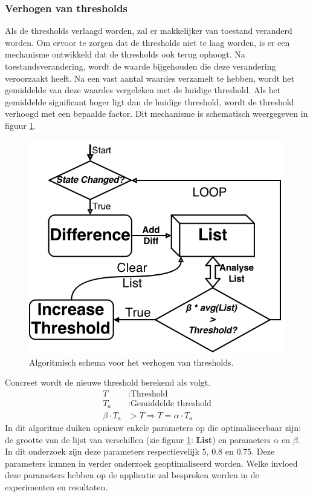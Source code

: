 \documentclass{article}
\newcommand{\figwidth}{0.75\linewidth}
\begin{document}
\subsubsection*{Verhogen van thresholds}\label{sec:verhogenthres}
Als de thresholds verlaagd worden, zal er makkelijker van toestand veranderd worden. Om ervoor te zorgen dat de thresholds niet te laag worden, is er een mechanisme ontwikkeld dat de thresholds ook terug ophoogt. Na toestandsverandering, wordt de waarde bijgehouden die deze verandering veroorzaakt heeft. Na een vast aantal waardes verzamelt te hebben, wordt het gemiddelde van deze waardes vergeleken met de huidige threshold. Als het gemiddelde significant hoger ligt dan de huidige threshold, wordt de threshold verhoogd met een bepaalde factor. Dit mechanisme is schematisch weergegeven in figuur \ref{fig:algothresholdup}.
\begin{figure}[H]
	\centering
	\includegraphics[width=\figwidth]{images/thresholdtrainerup_bw}
	\caption{Algoritmisch schema voor het verhogen van thresholds.}
	\label{fig:algothresholdup}
\end{figure}
Concreet wordt de nieuwe threshold berekend als volgt.
\begin{align*}
T&: \text{Threshold}\\
T_a&: \text{Gemiddelde threshold}\\
\beta \cdot T_a &> T \Rightarrow T = \alpha \cdot T_a
\end{align*}
In dit algoritme duiken opnieuw enkele parameters op die optimaliseerbaar zijn: de grootte van de lijst van verschillen (zie figuur \ref{fig:algothresholdup}: \textbf{List}) en parameters $\alpha$ en $\beta$. In dit onderzoek zijn deze parameters respectievelijk $5$, $0.8$ en $0.75$. Deze parameters kunnen in verder onderzoek geoptimaliseerd worden. Welke invloed deze parameters hebben op de applicatie zal besproken worden in de experimenten en resultaten.
\end{document}
